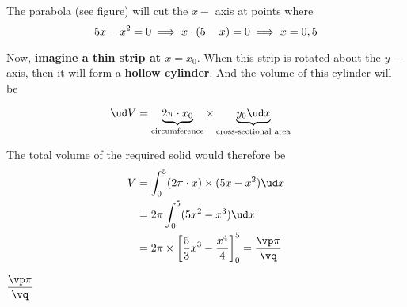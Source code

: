 \begin{solution}[\halfpage]
   The parabola (see figure) will cut the $x-$ axis at points where 
   \[ 5 x - x^2 = 0\implies x\cdot (5 - x) = 0 \implies x = 0,5 \]

   Now, \textbf{imagine a thin strip at $x = x_0$}. When this strip is rotated about the $y-$axis, 
   then it will form a \textbf{hollow cylinder}. And the volume of this cylinder will be 

   \begin{align}
     \ud V &= \underbrace{2\pi\cdot x_0}_{\text{circumference}}\times\underbrace{y_0\ud x}_{\text{cross-sectional area}}
   \end{align}
   
   The total volume of the required solid would therefore be 
   \begin{align}
   	 V &= \int_0^{\va} (2\pi\cdot x)\times(\va x-x^2)\ud x \\
   	   &= 2\pi\int_0^{\va} (\va x^2-x^3)\ud x \\
   	   &= 2\pi\times\left[\dfrac{\va}{3}x^3-\dfrac{x^4}{4}\right]_{0}^{\va} = \dfrac{\vp\pi}{\vq}
   \end{align}
\end{solution}

\ifprintanswers\begin{codex}$\dfrac{\vp\pi}\vq$\end{codex}\fi
